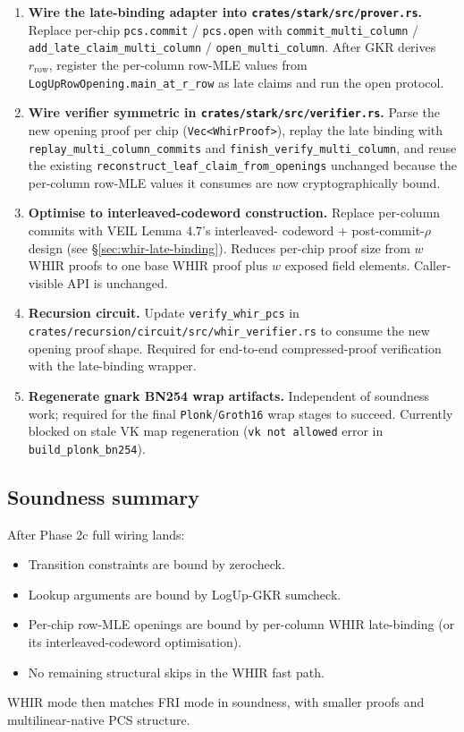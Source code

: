 \begin{enumerate}
  \item \textbf{Wire the late-binding adapter into
        \texttt{crates/stark/src/prover.rs}.}
        Replace per-chip \texttt{pcs.commit} / \texttt{pcs.open} with
        \texttt{commit\_multi\_column} / \texttt{add\_late\_claim\_multi\_column}
        / \texttt{open\_multi\_column}.  After GKR derives
        $r_{\mathrm{row}}$, register the per-column row-MLE values
        from \texttt{LogUpRowOpening.main\_at\_r\_row} as late claims
        and run the open protocol.
  \item \textbf{Wire verifier symmetric in
        \texttt{crates/stark/src/verifier.rs}.}
        Parse the new opening proof per chip
        (\texttt{Vec<WhirProof>}), replay the late binding with
        \texttt{replay\_multi\_column\_commits} and
        \texttt{finish\_verify\_multi\_column}, and reuse the existing
        \texttt{reconstruct\_leaf\_claim\_from\_openings} unchanged
        because the per-column row-MLE values it consumes are now
        cryptographically bound.
  \item \textbf{Optimise to interleaved-codeword construction.}
        Replace per-column commits with VEIL Lemma 4.7's interleaved-
        codeword + post-commit-$\rho$ design (see
        \S\ref{sec:whir-late-binding}).  Reduces per-chip proof size
        from $w$ WHIR proofs to one base WHIR proof plus $w$ exposed
        field elements.  Caller-visible API is unchanged.
  \item \textbf{Recursion circuit.}  Update
        \texttt{verify\_whir\_pcs} in
        \texttt{crates/recursion/circuit/src/whir\_verifier.rs} to
        consume the new opening proof shape.  Required for end-to-end
        compressed-proof verification with the late-binding wrapper.
  \item \textbf{Regenerate gnark BN254 wrap artifacts.}  Independent
        of soundness work; required for the final
        \texttt{Plonk}/\texttt{Groth16} wrap stages to succeed.
        Currently blocked on stale VK map regeneration
        (\texttt{vk not allowed} error in
        \texttt{build\_plonk\_bn254}).
\end{enumerate}

\subsection{Soundness summary}

After Phase 2c full wiring lands:

\begin{itemize}
  \item Transition constraints are bound by zerocheck.
  \item Lookup arguments are bound by LogUp-GKR sumcheck.
  \item Per-chip row-MLE openings are bound by per-column WHIR
        late-binding (or its interleaved-codeword optimisation).
  \item No remaining structural skips in the WHIR fast path.
\end{itemize}

WHIR mode then matches FRI mode in soundness, with smaller proofs and
multilinear-native PCS structure.

